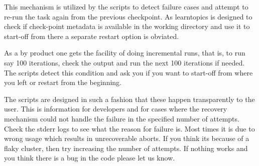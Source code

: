 \begin{DoxyEnumerate}
\begin{DoxyEnumerate}
This mechanism is utilized by the scripts to detect failure cases and attempt to re-\/run the task again from the previous checkpoint. As learntopics is designed to check if check-\/point metadata is available in the working directory and use it to start-\/off from there a separate restart option is obviated.  

As a by product one gets the facility of doing incremental runs, that is, to run say 100 iterations, check the output and run the next 100 iterations if needed. The scripts detect this condition and ask you if you want to start-\/off from where you left or restart from the beginning. 

The scripts are designed in such a fashion that these happen transparently to the user. This is information for developers and for cases where the recovery mechanism could not handle the failure in the specified number of attempts. Check the stderr logs to see what the reason for failure is. Most times it is due to wrong usage which results in unrecoverable aborts. If you think its because of a flaky cluster, then try increasing the number of attempts. If nothing works and you think there is a bug in the code please let us know. 
\end{DoxyEnumerate}
\end{DoxyEnumerate}
